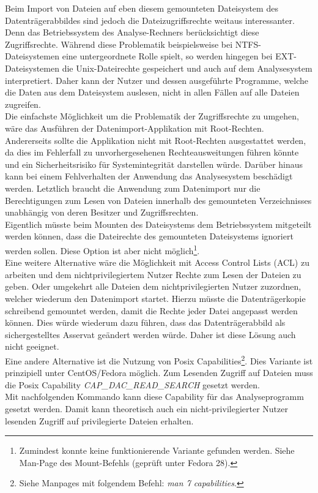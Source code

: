 \noindent
Beim Import von Dateien auf eben diesem gemounteten Dateisystem des Datenträgerabbildes sind jedoch die Dateizugriffsrechte weitaus interessanter. Denn das Betriebssystem des Analyse-Rechners berücksichtigt diese Zugriffsrechte. Während diese Problematik beispielsweise bei NTFS-Dateisystemen eine untergeordnete Rolle spielt, so werden hingegen bei EXT-Dateisystemen die Unix-Dateirechte gespeichert und auch auf dem Analysesystem interpretiert. 
Daher kann der Nutzer und dessen ausgeführte Programme, welche die Daten aus dem Dateisystem auslesen, nicht in allen Fällen auf alle Dateien zugreifen.\\

\noindent
Die einfachste Möglichkeit um die Problematik der Zugriffsrechte zu umgehen, wäre das Ausführen der Datenimport-Applikation mit Root-Rechten. Andererseits sollte die Applikation nicht mit Root-Rechten ausgestattet werden, da dies im Fehlerfall zu unvorhergesehenen Rechteausweitungen führen könnte und ein Sicherheitsrisiko für Systemintegrität darstellen würde. Darüber hinaus kann bei einem Fehlverhalten der Anwendung das Analysesystem beschädigt werden. Letztlich braucht die Anwendung zum Datenimport nur die Berechtigungen zum Lesen von Dateien innerhalb des gemounteten Verzeichnisses unabhängig von deren Besitzer und Zugriffsrechten.\\

\noindent
Eigentlich müsste beim Mounten des Dateisystems dem Betriebssystem mitgeteilt werden können, dass die Dateirechte des gemounteten Dateisystems ignoriert werden sollen. Diese Option ist aber nicht möglich\footnote{Zumindest konnte keine funktionierende Variante gefunden werden. Siehe Man-Page des Mount-Befehls (geprüft unter Fedora 28).}.\\
Eine weitere Alternative wäre die Möglichkeit mit Access Control Lists (ACL) zu arbeiten und dem nichtprivilegiertem Nutzer Rechte zum Lesen der Dateien zu geben. Oder umgekehrt alle Dateien dem nichtprivilegierten Nutzer zuzordnen, welcher wiederum den Datenimport startet.
Hierzu müsste die Datenträgerkopie schreibend gemountet werden, damit die Rechte jeder Datei angepasst werden können. Dies würde wiederum dazu führen, dass das Datenträgerabbild als sichergestelltes Asservat geändert werden würde. 
Daher ist diese Lösung auch nicht geeignet.\\

\noindent
Eine andere Alternative ist die Nutzung von Posix Capabilities\footnote{Siehe Manpages mit folgendem Befehl: \textit{ man 7 capabilities}.}. Dies Variante ist prinzipiell unter CentOS/Fedora möglich. Zum Lesenden Zugriff auf Dateien muss die Posix Capability \textit{CAP\_DAC\_READ\_SEARCH} gesetzt werden.\\
Mit nachfolgenden Kommando kann diese Capability für das Analyseprogramm gesetzt werden.
Damit kann theoretisch auch ein nicht-privilegierter Nutzer lesenden Zugriff auf privilegierte Dateien erhalten.\\ 

